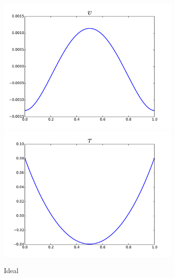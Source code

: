 \documentclass{article}
\begin{document}
\begin{figure}[ht]
\centering
\begin{subfigure}[t]{0.4\textwidth}
\centering
\includegraphics[width=\textwidth]{OptimalTestFunctions/uLinear_1e-2/steady/coupledrobust_steady_v}\\
\includegraphics[width=\textwidth]{OptimalTestFunctions/uLinear_1e-2/steady/coupledrobust_steady_tau}\\
\caption{Ideal}
\label{fig:idealRobust}
\end{subfigure}
\begin{subfigure}[t]{0.4\textwidth}
\centering

\end{subfigure}
\end{figure}
\end{document}
